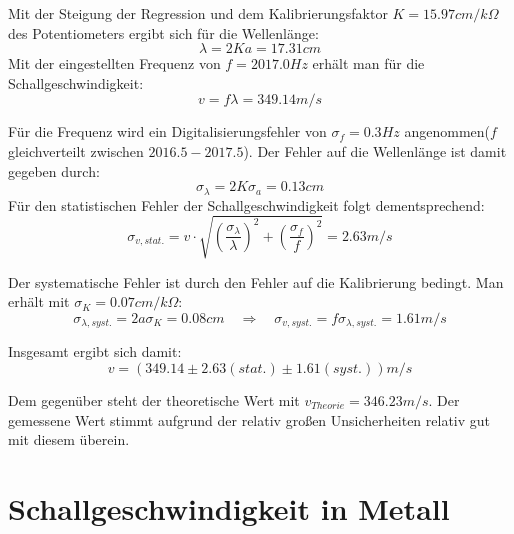 \documentclass[12pt,a4paper]{article}
\begin{document}
Mit der Steigung der Regression und dem Kalibrierungsfaktor $K=15.97 cm/k\Omega$ des Potentiometers ergibt sich für die Wellenlänge:
\begin{equation}
\lambda=2Ka=17.31cm
\end{equation}
Mit der eingestellten Frequenz von $f=2017.0Hz$ erhält man für die Schallgeschwindigkeit:
\begin{equation}
v=f \lambda = 349.14m/s
\end{equation}

Für die Frequenz wird ein Digitalisierungsfehler von $\sigma_f=0.3Hz$ angenommen($f$ gleichverteilt zwischen $2016.5-2017.5$). Der Fehler auf die Wellenlänge ist damit gegeben durch:
\begin{equation}
\sigma_{\lambda}=2K \sigma_a=0.13cm
\end{equation}
Für den statistischen Fehler der Schallgeschwindigkeit folgt dementsprechend:
\begin{equation}
\sigma_{v,stat.}=v \cdot \sqrt{(\frac{\sigma_{\lambda}}{\lambda})^2+(\frac{\sigma_f}{f})^2}=2.63m/s
\end{equation}

Der systematische Fehler ist durch den Fehler auf die Kalibrierung bedingt. Man erhält mit $\sigma_K=0.07cm/k\Omega$:
\begin{equation}
\sigma_{\lambda,syst.}=2a \sigma_K=0.08cm \quad \Rightarrow \quad \sigma_{v,syst.}=f \sigma_{\lambda,syst.}=1.61m/s
\end{equation}

Insgesamt ergibt sich damit:
\begin{equation}
v=(349.14 \pm 2.63(stat.) \pm 1.61(syst.))m/s
\end{equation}

Dem gegenüber steht der theoretische Wert mit $v_{Theorie}=346.23m/s$. Der gemessene Wert stimmt aufgrund der relativ großen Unsicherheiten relativ gut mit diesem überein.















\section{Schallgeschwindigkeit in Metall}
\end{document}
